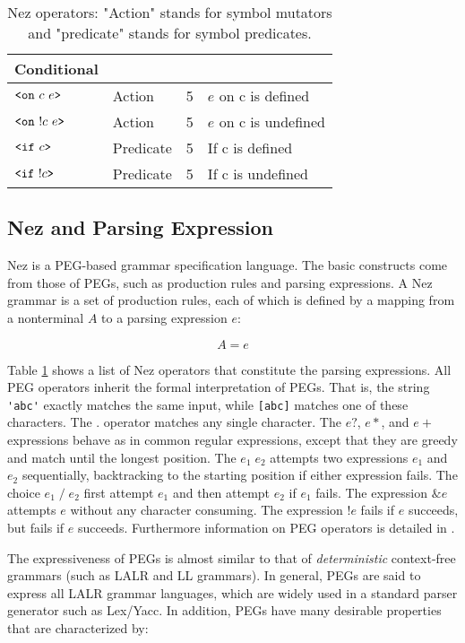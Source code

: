 \documentclass[preprint]{sigplanconf}
\begin{document}
\begin{table}[bt]
\begin{center}
\begin{tabular}{llll}
Conditional  &  &  & \\ \hline

$\verb|<on| ~c~e\verb|>|$ & Action & 5 & $e$ on c is defined \\ 
$\verb|<on| ~!c~e\verb|>|$ & Action & 5 & $e$ on c is undefined \\ 
$\verb|<if| ~c\verb|>|$ & Predicate & 5 & If c is defined  \\ 
$\verb|<if| ~!c\verb|>|$ & Predicate & 5 & If c is undefined  \\ \hline
\end{tabular}

\caption{Nez operators: "Action" stands for symbol mutators and "predicate" stands for symbol predicates. } 
\label{table:nez}

\end{center}
\end{table}

\subsection{Nez and Parsing Expression}

Nez is a PEG-based grammar specification language. The basic constructs come from those of PEGs, such as production rules and parsing expressions. A Nez grammar is a set of production rules, each of which is defined by a mapping from a nonterminal $A$ to a parsing expression $e$:

\[
A = e
\]

Table \ref{table:nez} shows a list of Nez operators that constitute the parsing expressions. All PEG operators inherit the formal interpretation of PEGs\cite{POPL04_PEG}. That is, the string \verb|'abc'| exactly matches the same input, while \verb|[abc]| matches one of these characters. The . operator matches any single character. The $e?$, $e*$, and $e+$ expressions behave as in common regular expressions, except that they are greedy and match until the longest position. The $e_1\;e_2$ attempts two expressions $e_1$ and $e_2$ sequentially, backtracking to the starting position if either expression fails.  The choice $e_1\;/\; e_2$ first attempt $e_1$ and then attempt $e_2$ if $e_1$ fails. The expression $\&e$ attempts $e$ without any character consuming. The expression $!e$ fails if $e$ succeeds, but fails if $e$ succeeds. Furthermore information on PEG operators is detailed in \cite{POPL04_PEG}.

The expressiveness of PEGs is almost similar to that of {\em deterministic} context-free grammars (such as LALR and LL grammars). In general, PEGs are said to express all LALR grammar languages, which are widely used in a standard parser generator such as Lex/Yacc\cite{Yacc}. In addition, PEGs have many desirable properties that are characterized by:
\end{document}
